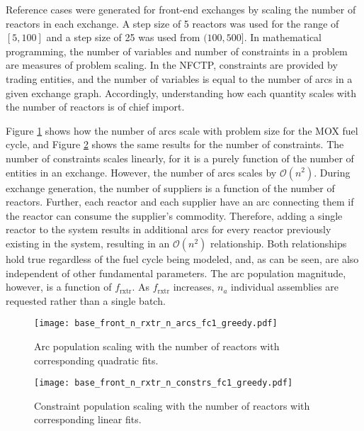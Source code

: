 Reference cases were generated for front-end exchanges by scaling the number of
reactors in each exchange. A step size of 5 reactors was used for the range of
$[5, 100]$ and a step size of 25 was used from $(100, 500]$. In mathematical
  programming, the number of variables and number of constraints in a problem
  are measures of problem scaling. In the NFCTP, constraints are provided by
  trading entities, and the number of variables is equal to the number of arcs
  in a given exchange graph. Accordingly, understanding how each quantity scales
  with the number of reactors is of chief import.

Figure \ref{fig:base_front_n_rxtr_n_arcs_fc1_greedy} shows how the number
of arcs scale with problem size for the MOX fuel cycle, and Figure
\ref{fig:base_front_n_rxtr_n_constrs_fc1_greedy} shows the same results
for the number of constraints. The number of constraints scales linearly, for it
is a purely function of the number of entities in an exchange. However, the
number of arcs scales by $\mathcal{O}(n^2)$. During exchange generation, the
number of suppliers is a function of the number of reactors. Further, each
reactor and each supplier have an arc connecting them if the reactor can consume
the supplier's commodity. Therefore, adding a single reactor to the system
results in additional arcs for every reactor previously existing in the system,
resulting in an $\mathcal{O}(n^2)$ relationship. Both relationships hold true
regardless of the fuel cycle being modeled, and, as can be seen, are also
independent of other fundamental parameters. The arc population magnitude,
however, is a function of $f_\text{rxtr}$. As $f_\text{rxtr}$ increases, $n_a$
individual assemblies are requested rather than a single batch.

\begin{figure}[h!]
  \begin{center}
    \texttt{[image: base\_front\_n\_rxtr\_n\_arcs\_fc1\_greedy.pdf]}
    \caption{
      \label{fig:base_front_n_rxtr_n_arcs_fc1_greedy}
      Arc population scaling with the number of reactors with corresponding
      quadratic fits.}
  \end{center}
\end{figure}

\begin{figure}[h!]
  \begin{center}
    \texttt{[image: base\_front\_n\_rxtr\_n\_constrs\_fc1\_greedy.pdf]}
    \caption{
      \label{fig:base_front_n_rxtr_n_constrs_fc1_greedy}
      Constraint population scaling with the number of reactors with
      corresponding linear fits.}
  \end{center}
\end{figure}

